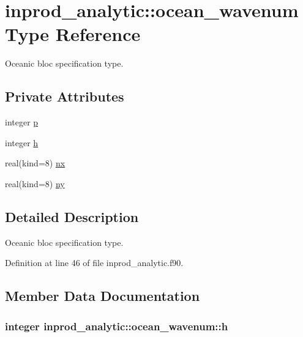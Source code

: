 \hypertarget{structinprod__analytic_1_1ocean__wavenum}{}\section{inprod\+\_\+analytic\+:\+:ocean\+\_\+wavenum Type Reference}
\label{structinprod__analytic_1_1ocean__wavenum}


Oceanic bloc specification type.  


\subsection*{Private Attributes}
\begin{DoxyCompactItemize}
\item 
integer \hyperlink{structinprod__analytic_1_1ocean__wavenum_a3170ff1b2a81b58ae81527a964682c06}{p}
\item 
integer \hyperlink{structinprod__analytic_1_1ocean__wavenum_a0669827dd9b250ef505da012599c40ff}{h}
\item 
real(kind=8) \hyperlink{structinprod__analytic_1_1ocean__wavenum_a6084ea7c554f942e74779a2be38b7d3d}{nx}
\item 
real(kind=8) \hyperlink{structinprod__analytic_1_1ocean__wavenum_a0738c305f503d7864a9073c5cea352ab}{ny}
\end{DoxyCompactItemize}


\subsection{Detailed Description}
Oceanic bloc specification type. 

Definition at line 46 of file inprod\+\_\+analytic.\+f90.



\subsection{Member Data Documentation}
\subsubsection[{\texorpdfstring{h}{h}}]{\setlength{\rightskip}{0pt plus 5cm}integer inprod\+\_\+analytic\+::ocean\+\_\+wavenum\+::h\hspace{0.3cm}{\ttfamily [private]}}\hypertarget{structinprod__analytic_1_1ocean__wavenum_a0669827dd9b250ef505da012599c40ff}{}\label{structinprod__analytic_1_1ocean__wavenum_a0669827dd9b250ef505da012599c40ff}


